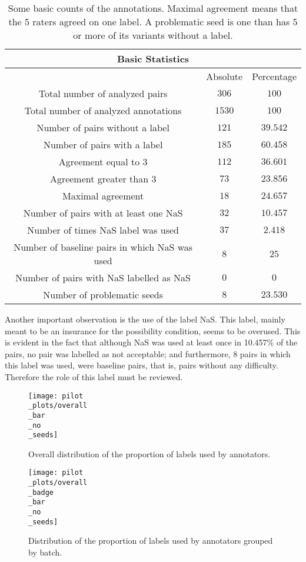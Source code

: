 \begin{table}
\centering
\begin{tabular}{|c|c|c|}
\hline
\multicolumn{3}{|c|}{Basic Statistics}\\\hline
  & Absolute & Percentage \\\hline
Total number of analyzed pairs & $306$ & $100$\\\hline
Total number of analyzed annotations & $1530$ & $100$\\\hline
Number of pairs without a label & $121$ & $39.542$\\\hline
Number of pairs with a label & $185$ & $60.458$\\\hline
Agreement equal to 3 & $112$ & $36.601$\\\hline 
Agreement greater than 3 & $73$ & $23.856$\\\hline
Maximal agreement & $18$ & $24.657$\\\hline
Number of pairs with at least one NaS & $32$ & $10.457$\\\hline
Number of times NaS label was used & $37$ & $2.418$\\\hline
Number of baseline pairs in which NaS was used & $8$ & $25$\\\hline
Number of pairs with NaS labelled as NaS & $0$ & $0$\\\hline
Number of problematic seeds & $8$ & $23.530$\\\hline                                                  
\end{tabular}
\caption[Basic counts of the annotations.]{Some basic counts of the annotations. Maximal agreement means that the 5 raters agreed on one label. A problematic seed is one than has 5 or more of its variants without a label.}
\label{tab:pilbasstats}
\end{table}

Another important observation is the use of the label NaS. This label, mainly meant to be an insurance for the possibility condition, seems to be overused. This is evident in the fact that although NaS was used at least once in 10.457\% of the pairs, no pair was labelled as not acceptable; and furthermore, 8 pairs in which this label was used, were baseline pairs, that is, pairs without any difficulty. Therefore the role of this label must be reviewed.\\ 

\begin{figure}
\centering
\parbox{10cm}{\texttt{[image: pilot\\\_plots/overall\\\_bar\\\_no\\\_seeds]}
\caption[Distribution of labels.]{Overall distribution of the proportion of labels used by annotators.}\label{fig:pilallbar}}
\qquad
\begin{minipage}{10cm}
\texttt{[image: pilot\\\_plots/overall\\\_badge\\\_bar\\\_no\\\_seeds]}
\caption[Distribution of labels by batch.]{Distribution of the proportion of labels used by annotators grouped by batch.}\label{fig:batchbar}
\end{minipage}
\end{figure}

